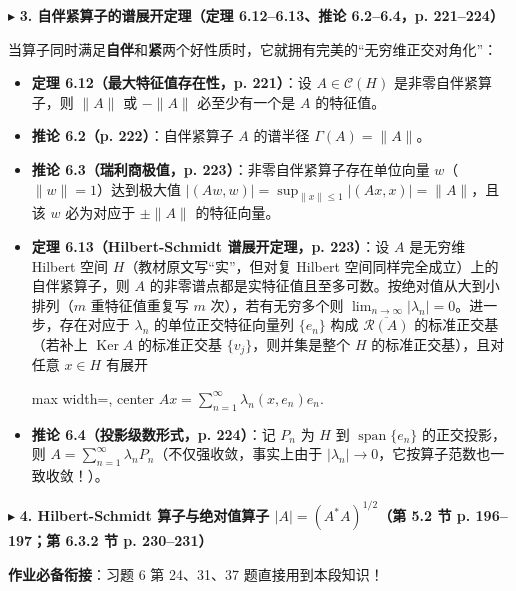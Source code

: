 \documentclass[11pt,a4paper]{article}
\providecommand{\tightlist}{\setlength{\itemsep}{1.8pt}\setlength{\parskip}{0pt}}
\newcommand{\SubSubHeading}[1]{%
  \Needspace{6.5\baselineskip}\vspace{5.5pt}\noindent
  \textcolor{AccentMain}{\scriptsize$\blacktriangleright$}\hspace{4pt}%
  {\small\bfseries\color{AccentMain}#1}\par\nopagebreak[4]\vspace{2.5pt}%
}
\renewenvironment{quote}{%
  \begin{tcolorbox}[
    enhanced,
    breakable,
    colback=AccentSoft!48!white,
    colframe=AccentMain,
    boxrule=0pt,
    leftrule=2.8pt,
    arc=2.5pt,
    left=9pt, right=8pt, top=6pt, bottom=6pt,
    before skip=5.5pt, after skip=5.5pt
  ]\small
}{%
  \end{tcolorbox}%
}
\newcommand{\FitDisplayMath}[1]{%
  \par\vspace{4pt}\noindent
  \begin{adjustbox}{max width=\linewidth, center}
    $\displaystyle #1$
  \end{adjustbox}
  \par\vspace{4pt}%
}
\begin{document}
\SubSubHeading{3. 自伴紧算子的谱展开定理（定理 6.12--6.13、推论 6.2--6.4，p. 221--224）}

当算子同时满足\textbf{自伴}和\textbf{紧}两个好性质时，它就拥有完美的``无穷维正交对角化''：

\begin{itemize}
\tightlist
\item
  \textbf{定理 6.12（最大特征值存在性，p. 221）}：设 \(A \in \mathcal{C}(H)\) 是非零自伴紧算子，则 \(\|A\|\) 或 \(-\|A\|\) 必至少有一个是 \(A\) 的特征值。
\item
  \textbf{推论 6.2（p. 222）}：自伴紧算子 \(A\) 的谱半径 \(\Gamma(A) = \|A\|\)。
\item
  \textbf{推论 6.3（瑞利商极值，p. 223）}：非零自伴紧算子存在单位向量 \(w\)（\(\|w\|=1\)）达到极大值 \(|(Aw, w)| = \sup_{\|x\|\le 1}|(Ax, x)| = \|A\|\)，且该 \(w\) 必为对应于 \(\pm\|A\|\) 的特征向量。
\item
  \textbf{定理 6.13（Hilbert-Schmidt 谱展开定理，p. 223）}：设 \(A\) 是无穷维 Hilbert 空间 \(H\)（教材原文写``实''，但对复 Hilbert 空间同样完全成立）上的自伴紧算子，则 \(A\) 的非零谱点都是实特征值且至多可数。按绝对值从大到小排列（\(m\) 重特征值重复写 \(m\) 次），若有无穷多个则 \(\lim_{n\to\infty} |\lambda_n| = 0\)。进一步，存在对应于 \(\lambda_n\) 的单位正交特征向量列 \(\{e_n\}\) 构成 \(\overline{\mathcal{R}(A)}\) 的标准正交基（若补上 \(\operatorname{Ker} A\) 的标准正交基 \(\{v_j\}\)，则并集是整个 \(H\) 的标准正交基），且对任意 \(x \in H\) 有展开 
\FitDisplayMath{Ax = \sum_{n=1}^{\infty} \lambda_n (x, e_n) e_n.}

\item
  \textbf{推论 6.4（投影级数形式，p. 224）}：记 \(P_n\) 为 \(H\) 到 \(\operatorname{span}\{e_n\}\) 的正交投影，则 \(A = \sum_{n=1}^\infty \lambda_n P_n\)（不仅强收敛，事实上由于 \(|\lambda_n| \to 0\)，它按算子范数也一致收敛！）。
\end{itemize}

\SubSubHeading{4. Hilbert-Schmidt 算子与绝对值算子 \(|A| = (A^*A)^{1/2}\)（第 5.2 节 p. 196--197；第 6.3.2 节 p. 230--231）}

\begin{quote}
\textbf{作业必备衔接}：习题 6 第 24、31、37 题直接用到本段知识！
\end{quote}
\end{document}
